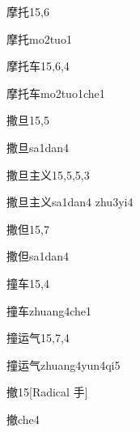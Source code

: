 \begin{entry}{摩托}{15,6}
  \begin{phonetics}{摩托}{mo2tuo1}
  \end{phonetics}
\end{entry}

\begin{entry}{摩托车}{15,6,4}
  \begin{phonetics}{摩托车}{mo2tuo1che1}
  \end{phonetics}
\end{entry}

\begin{entry}{撒旦}{15,5}
  \begin{phonetics}{撒旦}{sa1dan4}
  \end{phonetics}
\end{entry}

\begin{entry}{撒旦主义}{15,5,5,3}
  \begin{phonetics}{撒旦主义}{sa1dan4 zhu3yi4}
  \end{phonetics}
\end{entry}

\begin{entry}{撒但}{15,7}
  \begin{phonetics}{撒但}{sa1dan4}
  \end{phonetics}
\end{entry}

\begin{entry}{撞车}{15,4}
  \begin{phonetics}{撞车}{zhuang4che1}
  \end{phonetics}
\end{entry}

\begin{entry}{撞运气}{15,7,4}
  \begin{phonetics}{撞运气}{zhuang4yun4qi5}
  \end{phonetics}
\end{entry}

\begin{entry}{撤}{15}[Radical 手]
  \begin{phonetics}{撤}{che4}
  \end{phonetics}
\end{entry}

